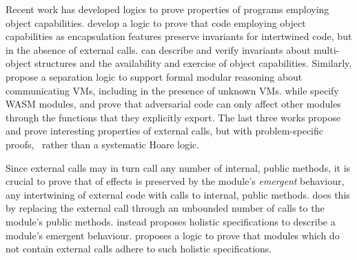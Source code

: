 Recent work has developed logics to prove properties of programs employing object capabilities.
\citet{ddd} develop a logic to prove that   code employing object
capabilities as encapsulation features preserve invariants for
intertwined code, but in the absence of external calls. 
  \citet{dd}  can describe and verify invariants
about multi-object structures and the availability and exercise of object capabilities.  %
 Similarly,
{\citet{vmsl-pldi2023} propose a separation logic to support formal modular reasoning about communicating VMs, including in the presence of unknown VMs.
while \cite{irisWasm23} specify WASM modules, %
and prove that adversarial code  can only affect other modules through the functions} that they explicitly export.
{The last three works propose and prove interesting properties of external calls, but with problem-specific proofs, \ rather than a systematic Hoare logic.}




Since external calls may in turn call any number of internal, public methods, 
it is crucial  to prove that \taming of effects is preserved by the module's 
\emph{emergent} behaviour, \ie any intertwining of external code with calls to internal, public methods.
\citet{CassezFQ24} 
does this by replacing the external call through an unbounded number of calls to the module's public methods.
\citet{FASE} instead proposes holistic specifications to describe a module's emergent behaviour. 
\citet{OOPSLA22} proposes 
a logic to prove that modules which do not contain external calls adhere to such holistic specifications.



